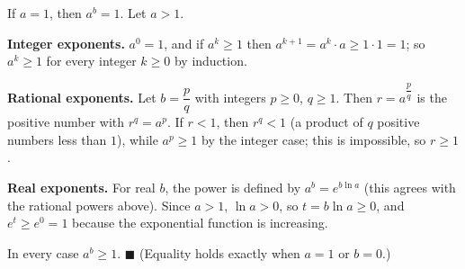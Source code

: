 If $a=1$, then $a^b=1$. Let $a>1$.

\textbf{Integer exponents.} $a^0=1$, and if $a^k\ge1$ then $a^{k+1}=a^k\cdot a\ge1\cdot1=1$; so $a^k\ge1$ for every integer $k\ge0$ by induction.

\textbf{Rational exponents.} Let $b=\dfrac pq$ with integers $p\ge0$, $q\ge1$. Then $r=a^{\dfrac pq}$ is the positive number with $r^q=a^p$. If $r<1$, then $r^q<1$ (a product of $q$ positive numbers less than $1$), while $a^p\ge1$ by the integer case; this is impossible, so $r\ge1$.

\textbf{Real exponents.} For real $b$, the power is defined by $a^b=e^{b\ln a}$ (this agrees with the rational powers above). Since $a>1$, $\ln a>0$, so $t=b\ln a\ge0$, and $e^t\ge e^0=1$ because the exponential function is increasing.

In every case $a^b\ge1$. $\blacksquare$ (Equality holds exactly when $a=1$ or $b=0$.)
